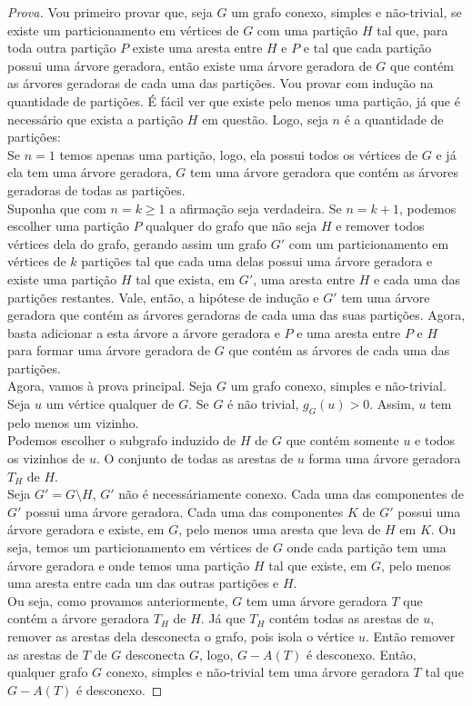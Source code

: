 \documentclass[12pt]{article}
\begin{document}
\begin{proof}[Prova]
Vou primeiro provar que, seja $G$ um grafo conexo, simples e não-trivial, se existe um particionamento em vértices de $G$ com uma partição $H$ tal que, para toda outra partição $P$ existe uma aresta entre $H$ e $P$ e tal que cada partição possui uma árvore geradora, então existe uma árvore geradora de $G$ que contém as árvores geradoras de cada uma das partições. Vou provar com indução na quantidade de partições. É fácil ver que existe pelo menos uma partição, já que é necessário que exista a partição $H$ em questão. Logo, seja $n$ é a quantidade de partições: \\
Se $n = 1$ temos apenas uma partição, logo, ela possui todos os vértices de $G$ e já ela tem uma árvore geradora, $G$ tem uma árvore geradora que contém as árvores geradoras de todas as partições. \\
Suponha que com $n = k \geq 1$ a afirmação seja verdadeira. Se $n = k+1$, podemos escolher uma partição $P$ qualquer do grafo que não seja $H$ e remover todos vértices dela do grafo, gerando assim um grafo $G'$ com um particionamento em vértices de $k$ partições tal que cada uma delas possui uma árvore geradora e existe uma partição $H$ tal que exista, em $G'$, uma aresta entre $H$ e cada uma das partições restantes. Vale, então, a hipótese de indução e $G'$ tem uma árvore geradora que contém as árvores geradoras de cada uma das suas partições. Agora, basta adicionar a esta árvore a árvore geradora e $P$ e uma aresta entre $P$ e $H$ para formar uma árvore geradora de $G$ que contém as árvores de cada uma das partições. \\
Agora, vamos à prova principal. Seja $G$ um grafo conexo, simples e não-trivial. Seja $u$ um vértice qualquer de $G$. Se $G$ é não trivial, $g_G(u) > 0$. Assim, $u$ tem pelo menos um vizinho. \\
Podemos escolher o subgrafo induzido de $H$ de $G$ que contém somente $u$ e todos os vizinhos de $u$. O conjunto de todas as arestas de $u$ forma uma árvore geradora $T_H$ de $H$. \\
Seja $G' = G \setminus H$, $G'$ não é necessáriamente conexo. Cada uma das componentes de $G'$ possui uma árvore geradora. Cada uma das componentes $K$ de $G'$ possui uma árvore geradora e existe, em $G$, pelo menos uma aresta que leva de $H$ em $K$. Ou seja, temos um particionamento em vértices de $G$ onde cada partição tem uma árvore geradora e onde temos uma partição $H$ tal que existe, em $G$, pelo menos uma aresta entre cada um das outras partições e $H$. \\
Ou seja, como provamos anteriormente, $G$ tem uma árvore geradora $T$ que contém a árvore geradora $T_H$ de $H$. Já que $T_H$ contém todas as arestas de $u$, remover as arestas dela desconecta o grafo, pois isola o vértice $u$. Então remover as arestas de $T$ de $G$ desconecta $G$, logo, $G - A(T)$ é desconexo. Então, qualquer grafo $G$ conexo, simples e não-trivial tem uma árvore geradora $T$ tal que $G - A(T)$ é desconexo.
\end{proof}
\end{document}

